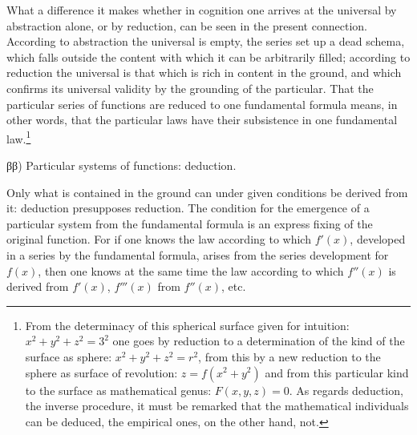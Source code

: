 \documentclass[12pt,a4paper,openany]{book}
\newcommand{\opage}[1]{\marginnote{\footnotesize\textit{[#1]}}}
\begin{document}
What a difference it makes whether in cognition one arrives at the universal by abstraction alone, or by reduction, can be seen in the present connection. According to abstraction the universal is empty, the series set up a dead schema, which falls outside the content with which it can be
\setcounter{footnote}{0}%
\opage{50}arbitrarily filled; according to reduction the universal is that which is rich in content in the ground, and which confirms its universal validity by the grounding of the particular. That the particular series of functions are reduced to one fundamental formula means, in other words, that the particular laws have their subsistence in one fundamental law.\footnote[1]{From the determinacy of this spherical surface given for intuition: $x^{2}+y^{2}+z^{2}=3^{2}$ one goes by reduction to a determination of the kind of the surface as sphere: $x^{2}+y^{2}+z^{2}=r^{2}$, from this by a new reduction to the sphere as surface of revolution: $z=f(x^{2}+y^{2})$ and from this particular kind to the surface as mathematical genus: $F(x,y,z)=0$. As regards deduction, the inverse procedure, it must be remarked that the mathematical individuals can be deduced, the empirical ones, on the other hand, not.} %

\begin{center}ββ) Particular systems of functions: deduction.\end{center}

Only what is contained in the ground can under given conditions be derived from it: deduction presupposes reduction. The condition for the emergence of a particular system from the fundamental formula is an express fixing of the original function. For if one knows the law according to which $f'(x)$, developed in a series by the fundamental formula, arises from the series development for $f(x)$, then one knows at the same time the law according to which $f''(x)$ is derived from $f'(x)$, $f'''(x)$ from $f''(x)$, etc. %
\end{document}
